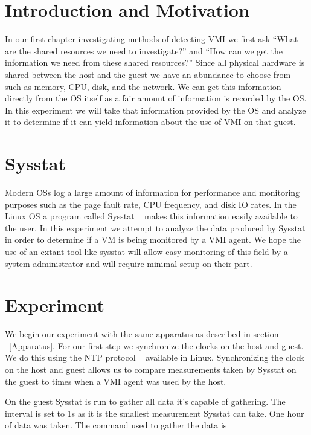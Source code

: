 \section{Introduction and Motivation}
In our first chapter investigating methods of detecting VMI we first ask ``What are the shared resources we need to investigate?'' and ``How can we get the information we need from these shared resources?'' Since all physical hardware is shared between the host and the guest we have an abundance to choose from such as memory, CPU, disk, and the network. We can get this information directly from the OS itself as a fair amount of information is recorded by the OS. In this experiment we will take that information provided by the OS and analyze it to determine if it can yield information about the use of VMI on that guest. 


\section{Sysstat}

Modern OSs log a large amount of information for performance and monitoring purposes such as the page fault rate, CPU frequency, and disk IO rates. In the Linux OS a program called Sysstat ~\cite{godard_sysstat_2010} makes this information easily available to the user. In this experiment we attempt to analyze the data produced by Sysstat in order to determine if a VM is being monitored by a VMI agent. We hope the use of an extant tool like sysstat will allow easy monitoring of this field by a system administrator and will require minimal setup on their part. 

\section{Experiment}

We begin our experiment with the same apparatus as described in section ~\ref{Apparatus}. For our first step we synchronize the clocks on the host and guest. We do this using the NTP protocol ~\cite{mills_internet_1991} available in Linux. Synchronizing the clock on the host and guest allows us to compare measurements taken by Sysstat on the guest to times when a VMI agent was used by the host.


On the guest Sysstat is run to gather all data it's capable of gathering. The interval is set to 1s as it is the smallest measurement Sysstat can take. One hour of data was taken. The command used to gather the data is 

